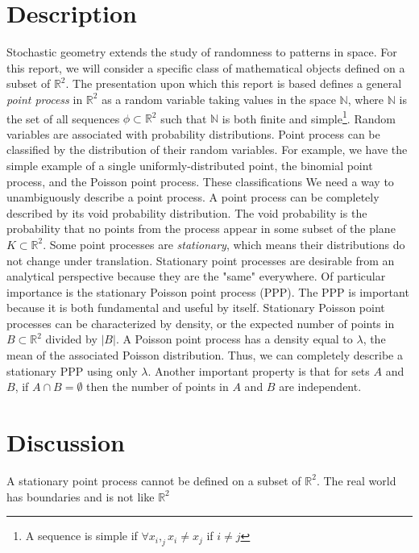 \documentclass[]{article}
\begin{document}
\section{Description}
Stochastic geometry extends the study of randomness to patterns in space. For this report, we will consider a specific class of mathematical objects defined on a subset of $\mathbb{R}^2$.  The presentation upon which this report is based defines a general \textit{point process} in $\mathbb{R}^2$ as a random variable taking values in the space $\mathbb{N}$, where $\mathbb{N}$ is the set of all sequences $\phi \subset \mathbb{R}^2$ such that $\mathbb{N}$ is both finite and simple\footnote{A sequence is simple if $\forall x_i,_j x_i \neq x_j$ if $i \neq j$}.
Random variables are associated with probability distributions. Point process can be classified by the distribution of their random variables. For example, we have the simple example of a single uniformly-distributed point, the binomial point process, and the Poisson point process. These classifications We need a way to unambiguously describe a point process. A point process can be completely described by its void probability distribution. The void probability is the probability that no points from the process appear in some subset of the plane $K \subset \mathbb{R}^2$.
Some point processes are \textit{stationary}, which means their distributions do not change under translation.
Stationary point processes are desirable from an analytical perspective because they are the "same" everywhere. Of particular importance is the stationary Poisson point process (PPP).
The PPP is important because it is both fundamental and useful by itself. Stationary Poisson point processes can be characterized by density, or the expected number of points in $B \subset \mathbb{R}^2$ divided by $|B|$. A Poisson point process has a density equal to $\lambda$, the mean of the associated Poisson distribution. Thus, we can completely describe a stationary PPP using only $\lambda$. Another important property is that for sets $A$ and $B$, if $A \cap B = \emptyset$ then the number of points in $A$ and $B$ are independent.

 

\section{Discussion}
 A stationary point process cannot be defined on a subset of $\mathbb{R}^2$. The real world has boundaries and is not like $\mathbb{R}^2$
\end{document}

